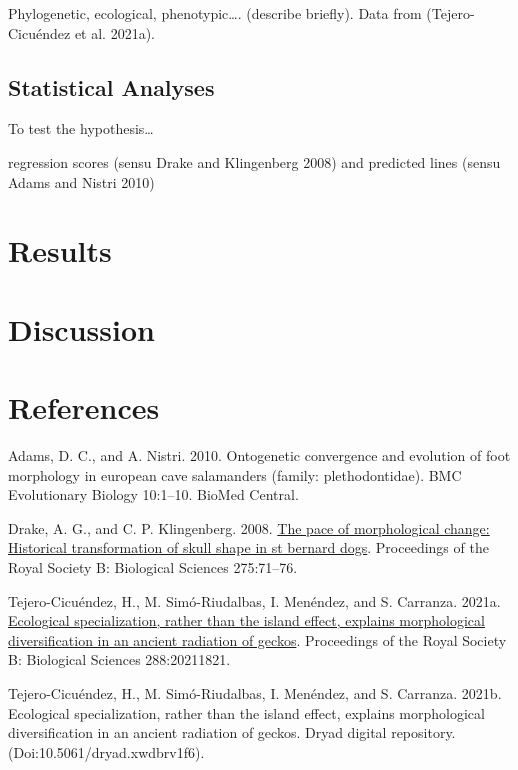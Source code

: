 \documentclass[
]{article}
\newlength{\cslhangindent}
\newlength{\cslentryspacingunit} %
\newenvironment{CSLReferences}[2] %
 {%
  \setlength{\parindent}{0pt}
  \ifodd #1
  \let\oldpar\par
  \def\par{\hangindent=\cslhangindent\oldpar}
  \fi
  \setlength{\parskip}{#2\cslentryspacingunit}
 }%
 {}
\begin{document}
Phylogenetic, ecological, phenotypic\ldots. (describe briefly). Data
from (Tejero-Cicuéndez et al. 2021a).

\hypertarget{statistical-analyses}{%
\subsection{Statistical Analyses}\label{statistical-analyses}}

To test the hypothesis\ldots{}

regression scores (sensu Drake and Klingenberg 2008) and predicted lines
(sensu Adams and Nistri 2010)

\hypertarget{results}{%
\section{Results}\label{results}}

\hypertarget{discussion}{%
\section{Discussion}\label{discussion}}

\newpage

\hypertarget{references}{%
\section*{References}\label{references}}

\setlength{\parindent}{-0.25in} \setlength{\leftskip}{0.25in}
\setlength{\parskip}{8pt} \noindent

\hypertarget{refs}{}
\begin{CSLReferences}{1}{0}
\leavevmode{}%
Adams, D. C., and A. Nistri. 2010. Ontogenetic convergence and evolution
of foot morphology in european cave salamanders (family:
plethodontidae). BMC Evolutionary Biology 10:1--10. BioMed Central.

\leavevmode{}%
Drake, A. G., and C. P. Klingenberg. 2008.
\href{https://doi.org/10.1098/rspb.2007.1169}{The pace of morphological
change: Historical transformation of skull shape in st bernard dogs}.
Proceedings of the Royal Society B: Biological Sciences 275:71--76.

\leavevmode{}%
Tejero-Cicuéndez, H., M. Simó-Riudalbas, I. Menéndez, and S. Carranza.
2021a. \href{https://doi.org/10.1098/rspb.2021.1821}{Ecological
specialization, rather than the island effect, explains morphological
diversification in an ancient radiation of geckos}. Proceedings of the
Royal Society B: Biological Sciences 288:20211821.

\leavevmode{}%
Tejero-Cicuéndez, H., M. Simó-Riudalbas, I. Menéndez, and S. Carranza.
2021b. Ecological specialization, rather than the island effect,
explains morphological diversification in an ancient radiation of
geckos. Dryad digital repository. (Doi:10.5061/dryad.xwdbrv1f6).

\end{CSLReferences}
\end{document}

